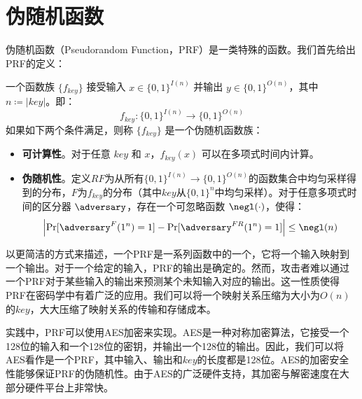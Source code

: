 \section{伪随机函数}
伪随机函数（Pseudorandom Function，PRF）是一类特殊的函数。我们首先给出PRF的定义：
\begin{definition}[伪随机函数族]
    一个函数族 $\{f_{key}\}$ 接受输入 $x\in\{0,1\}^{I(n)}$ 并输出 $y\in\{0,1\}^{O(n)}$，其中 $n \coloneqq |key|$。即：
    $$ f_{key}: \{0,1\}^{I(n)} \rightarrow \{0,1\}^{O(n)}$$
    如果如下两个条件满足，则称 $\{f_{key}\}$ 是一个伪随机函数族：
    \begin{itemize}
        \item \textbf{可计算性}。对于任意 $key$ 和 $x$，$f_{key}(x)$ 可以在多项式时间内计算。
        \item \textbf{伪随机性}。定义$RF$为从所有$\{0,1\}^{I(n)} \rightarrow \{0,1\}^{O(n)}$的函数集合中均匀采样得到的分布，$F$为$f_{key}$的分布（其中$key$从$\{0,1\}^{n}$中均匀采样）。对于任意多项式时间的区分器 $\adversary$，存在一个可忽略函数 $\negl(\cdot)$，使得：
        $$\left| \Pr[\adversary^{F}(1^n) = 1] - \Pr[\adversary^{FR}(1^n) = 1] \right| \le \negl(n)$$
    \end{itemize}
\end{definition}

以更简洁的方式来描述，一个PRF是一系列函数中的一个，它将一个输入映射到一个输出。对于一个给定的输入，PRF的输出是确定的。然而，攻击者难以通过一个PRF对于某些输入的输出来预测某个未知输入对应的输出。这一性质使得PRF在密码学中有着广泛的应用。我们可以将一个映射关系压缩为大小为$O(n)$的$key$，大大压缩了映射关系的传输和存储成本。

实践中，PRF可以使用AES加密来实现。AES是一种对称加密算法，它接受一个128位的输入和一个128位的密钥，并输出一个128位的输出。因此，我们可以将AES看作是一个PRF，其中输入、输出和$key$的长度都是128位。AES的加密安全性能够保证PRF的伪随机性。由于AES的广泛硬件支持，其加密与解密速度在大部分硬件平台上非常快。